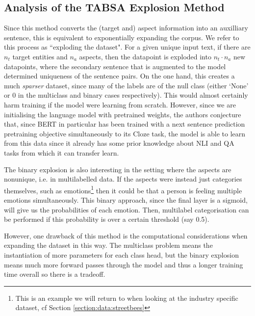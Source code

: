 {{\subsection{Analysis of the TABSA Explosion Method}
Since this method converts the (target and) aspect information into an auxilliary sentence, this is equivalent to exponentially expanding the corpus. We refer to this process as ``exploding the dataset". For a given unique input text, if there are $n_t$ target entities and $n_a$ aspects, then the datapoint is exploded into $n_t \cdot n_a$ new datapoints, where the secondary sentence that is augmented to the model determined uniqueness of the sentence pairs. On the one hand, this creates a much \textit{sparser} dataset, since many of the labels are of the null class (either `None' or 0 in the multiclass and binary cases respectively). This would almost certainly harm training if the model were learning from scratch. However, since we are initialising the language model with pretrained weights, the authors conjecture that, since BERT in particular has been trained with a next sentence prediction pretraining objective simultaneously to its Cloze task, the model is able to learn from this data since it already has some prior knowledge about NLI and QA tasks from which it can transfer learn.

The binary explosion is also interesting in the setting where the aspects are nonunique, i.e. in multilabelled data. If the aspects were instead just categories themselves, such as emotions\footnote{This is an example we will return to when looking at the industry specific dataset, cf Section \ref{section:data:streetbees}} then it could be that a person is feeling multiple emotions simultaneously. This binary approach, since the final layer is a sigmoid, will give us the probabilities of each emotion. Then, multilabel categorisation can be performed if this probability is over a certain threshold (say 0.5).

However, one drawback of this method is the computational considerations when expanding the dataset in this way. The multiclass problem means the instantiation of more parameters for each class head, but the binary explosion means much more forward passes through the model and thus a longer training time overall so there is a tradeoff.


}}
